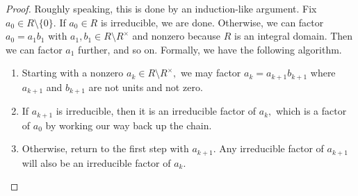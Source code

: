 \begin{proof}
    Roughly speaking, this is done by an induction-like argument. Fix $a_0\in R\setminus\{0\}.$ If $a_0\in R$ is irreducible, we are done. Otherwise, we can factor $a_0=a_1b_1$ with $a_1,b_1\in R\setminus R^\times$ and nonzero because $R$ is an integral domain. Then we can factor $a_1$ further, and so on. Formally, we have the following algorithm.
    \begin{enumerate}
        \item Starting with a nonzero $a_k\in R\setminus R^\times,$ we may factor $a_k=a_{k+1}b_{k+1}$ where $a_{k+1}$ and $b_{k+1}$ are not units and not zero.
        \item If $a_{k+1}$ is irreducible, then it is an irreducible factor of $a_k,$ which is a factor of $a_0$ by working our way back up the chain.
        \item Otherwise, return to the first step with $a_{k+1}.$ Any irreducible factor of $a_{k+1}$ will also be an irreducible factor of $a_k.$
    \end{enumerate}


\end{proof}
